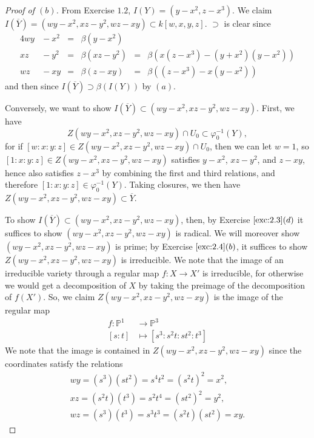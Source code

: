 \documentclass[12pt,letterpaper]{article}
\theoremstyle{definition}
\theoremstyle{remark}
\numberwithin{equation}{section}
\numberwithin{figure}{problem}
\newcommand{\PP}{\mathbb{P}}
\begin{document}
\begin{proof}[Proof of $(b)$]
  From Exercise $1.2$, $I(Y) = (y-x^2, z-x^3)$.
  We claim $I(\overline{Y}) = (wy-x^2,xz-y^2,wz-xy) \subset k[w,x,y,z]$.
  $\supset$ is clear since
  \begin{alignat*}{4}
    wy &{}- x^2 &{}={}& \beta(y-x^2)\\
    xz &{}- y^2 &{}={}& \beta(xz-y^2) &{}={}& \beta(x(z-x^3)-(y+x^2)(y-x^2))\\
    wz &{}- xy  &{}={}& \beta(z-xy)   &{}={}& \beta((z-x^3) - x(y-x^2))
  \end{alignat*}
  and then since $I(\overline{Y}) \supset \beta(I(Y))$ by $(a)$.
  \par Conversely, we want to show $I(\overline{Y}) \subset
  (wy-x^2,xz-y^2,wz-xy)$. First, we have
  \begin{equation*}
    Z(wy-x^2,xz-y^2,wz-xy) \cap U_0 \subset \varphi_0^{-1}(Y),
  \end{equation*}
  for if $[w:x:y:z] \in Z(wy-x^2,xz-y^2,wz-xy) \cap U_0$, then we can let $w=1$,
  so $[1:x:y:z] \in Z(wy-x^2,xz-y^2,wz-xy)$ satisfies $y-x^2$, $xz - y^2$, and
  $z - xy$, hence also satisfies $z - x^3$ by combining the first and third
  relations, and therefore $[1:x:y:z] \in 
  \varphi_0^{-1}(Y)$. Taking closures, we then have $Z(wy-x^2,xz-y^2,wz-xy)
  \subset \overline{Y}$.
  \par To show $I(\overline{Y}) \subset
  (wy-x^2,xz-y^2,wz-xy)$, then, by Exercise $\ref{exc:2.3}(d)$ it suffices to
  show $(wy-x^2,xz-y^2,wz-xy)$ is radical. We will moreover show
  $(wy-x^2,xz-y^2,wz-xy)$ is prime; by Exercise $\ref{exc:2.4}(b)$, it suffices
  to show $Z(wy-x^2,xz-y^2,wz-xy)$ is irreducible. We note that the image of an
  irreducible variety through a regular map $f\colon X \to X'$ is irreducible, for
  otherwise we would get a decomposition of $X$ by taking the preimage of the
  decomposition of $f(X')$. So, we claim $Z(wy-x^2,xz-y^2,wz-xy)$ is the image
  of the regular map
  \begin{align*}
    f\colon \mathbb{P}^1 &\to \PP^3\\
    [s:t] &\mapsto [s^3:s^2t:st^2:t^3]
  \end{align*}
  We note that the image is contained in $Z(wy-x^2,xz-y^2,wz-xy)$ since the
  coordinates satisfy the relations
  \begin{gather*}
    wy=(s^3)(st^2) = s^4t^2 = (s^2t)^2 = x^2,\\
    xz=(s^2t)(t^3) = s^2t^4 = (st^2)^2 = y^2,\\
    wz=(s^3)(t^3)=s^3t^3=(s^2t)(st^2)=xy.

\end{gather*}
\end{proof}
\end{document}
